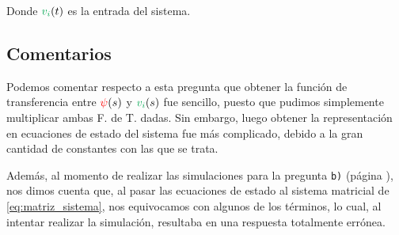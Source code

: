 Donde $\verd{v_{i}} (t)$ es la entrada del sistema.

\subsection{Comentarios}

Podemos comentar respecto a esta pregunta que obtener la función de transferencia
entre $\mathbin{\color{red}\psi}(s)$ y $\verd{v_{i}}(s)$ fue sencillo, puesto que pudimos
simplemente multiplicar ambas F. de T. dadas. Sin embargo, luego obtener la
representación en ecuaciones de estado del sistema fue más complicado, debido
a la gran cantidad de constantes con las que se trata.

Además, al momento de realizar las simulaciones para la pregunta \texttt{b)}
(página \pageref{pregunta-b}), nos dimos cuenta que, al pasar las ecuaciones
de estado al sistema matricial de \eqref{eq:matriz_sistema}, nos equivocamos
con algunos de los términos, lo cual, al intentar realizar la simulación,
resultaba en una respuesta totalmente errónea.

\FloatBarrier
\newpage
